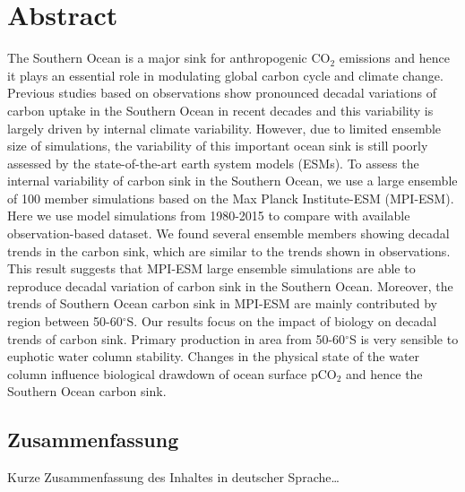 \begingroup
\let\clearpage\relax
\let\cleardoublepage\relax
\let\cleardoublepage\relax

\chapter*{Abstract}

The Southern Ocean is a major sink for anthropogenic CO$_2$ emissions and hence it plays an essential role in modulating global carbon cycle and climate change. Previous studies based on observations show pronounced decadal variations of carbon uptake in the Southern Ocean in recent decades and this variability is largely driven by internal climate variability. However, due to limited ensemble size of simulations, the variability of this important ocean sink is still poorly assessed by the state-of-the-art earth system models (ESMs). To assess the internal variability of carbon sink in the Southern Ocean, we use a large ensemble of 100 member simulations based on the Max Planck Institute-ESM (MPI-ESM). Here we use model simulations from 1980-2015 to compare with available observation-based dataset. We found several ensemble members showing decadal trends in the carbon sink, which are similar to the trends shown in observations. This result suggests that MPI-ESM large ensemble simulations are able to reproduce decadal variation of carbon sink in the Southern Ocean. Moreover, the trends of Southern Ocean carbon sink in MPI-ESM are mainly contributed by region between 50-60$^\circ$S. %
Our results focus on the impact of biology on decadal trends of carbon sink. Primary production in area from 50-60$^\circ$S is very sensible to euphotic water column stability. Changes in the physical state of the water column influence biological drawdown of ocean surface pCO$_2$ and hence the Southern Ocean carbon sink.
  
\vfill

\begin{otherlanguage}{ngerman}
\chapter*{Zusammenfassung}
Kurze Zusammenfassung des Inhaltes in deutscher Sprache\dots 
\end{otherlanguage}

\endgroup			

\vfill